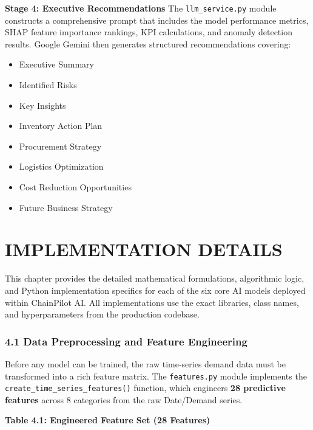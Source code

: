 \documentclass[12pt, a4paper]{report}
\begin{document}
\textbf{Stage 4: Executive Recommendations}
The \texttt{llm\_service.py} module constructs a comprehensive prompt that includes the model performance metrics, SHAP feature importance rankings, KPI calculations, and anomaly detection results. Google Gemini then generates structured recommendations covering:
\begin{itemize}
\item Executive Summary
\item Identified Risks
\item Key Insights
\item Inventory Action Plan
\item Procurement Strategy
\item Logistics Optimization
\item Cost Reduction Opportunities
\item Future Business Strategy
\end{itemize}


\clearpage

\chapter{IMPLEMENTATION DETAILS}

This chapter provides the detailed mathematical formulations, algorithmic logic, and Python implementation specifics for each of the six core AI models deployed within ChainPilot AI. All implementations use the exact libraries, class names, and hyperparameters from the production codebase.

\subsection{4.1 Data Preprocessing and Feature Engineering}

Before any model can be trained, the raw time-series demand data must be transformed into a rich feature matrix. The \texttt{features.py} module implements the \texttt{create\_time\_series\_features()} function, which engineers \textbf{28 predictive features} across 8 categories from the raw Date/Demand series.

\textbf{Table 4.1: Engineered Feature Set (28 Features)}
\end{document}
